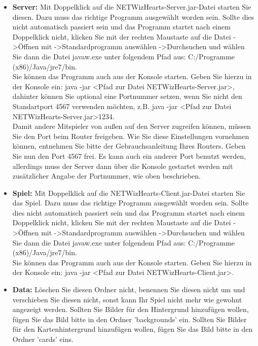 \documentclass[titlepage,10pt,a4paper]{article}
\begin{document}
\begin{itemize}
	\item \textbf{Server:} Mit Doppelklick auf die NETWizHearts-Server.jar-Datei starten Sie diesen.  Dazu muss das richtige Programm ausgewählt worden sein. Sollte dies nicht automatisch passiert sein und das Programm startet nach einem Doppelklick nicht, klicken Sie mit der rechten Maustaste auf die Datei -\textgreater Öffnen mit -\textgreater Standardprogramm auswählen -\textgreater Durchsuchen und wählen Sie dann die Datei javaw.exe unter folgendem Pfad aus: C:/Programme (x86)/Java/jre7/bin. \\
	Sie können das Programm auch aus der Konsole starten. Geben Sie hierzu in der Konsole ein: java -jar \textless Pfad zur Datei NETWizHearts-Server.jar\textgreater, dahinter können Sie optional eine Portnummer setzen, wenn Sie nicht den Standartport 4567 verwenden möchten, z.B.  java -jar \textless Pfad zur Datei NETWizHearts-Server.jar\textgreater 1234. \\
	Damit andere Mitspieler von außen auf den Server zugreifen können, müssen Sie den Port beim Router freigeben. Wie Sie diese Einstellungen vornehmen können, entnehmen Sie bitte der Gebrauchsanleitung Ihres Routers. Geben Sie nun den Port 4567 frei. Es kann auch ein anderer Port benutzt werden, allerdings muss der Server dann über die Konsole gestartet werden mit zusätzlicher Angabe der Portnummer, wie oben beschrieben.
	
	\item \textbf{Spiel:} Mit Doppelklick auf die NETWizHearts-Client.jar-Datei starten Sie das Spiel.  Dazu muss das richtige Programm ausgewählt worden sein. Sollte dies nicht automatisch passiert sein und das Programm startet nach einem Doppelklick nicht, klicken Sie mit der rechten Maustaste auf die Datei -\textgreater Öffnen mit -\textgreater Standardprogramm auswählen -\textgreater Durchsuchen und wählen Sie dann die Datei javaw.exe unter folgendem Pfad aus: C:/Programme (x86)/Java/jre7/bin. \\
	Sie können das Programm auch aus der Konsole starten. Geben Sie hierzu in der Konsole ein: java -jar \textless Pfad zur Datei NETWizHearts-Client.jar\textgreater.
	
	\item \textbf{Data:} Löschen Sie diesen Ordner nicht, benennen Sie diesen nicht um und verschieben Sie diesen nicht, sonst kann Ihr Spiel nicht mehr wie gewohnt angezeigt werden. Sollten Sie Bilder für den Hintergrund hinzufügen wollen, fügen Sie das Bild bitte in den Ordner 'backgrounds' ein. Sollten Sie Bilder für den Kartenhintergrund hinzufügen wollen, fügen Sie das Bild bitte in den Ordner 'cards' eins.
\end{itemize}
\end{document}
